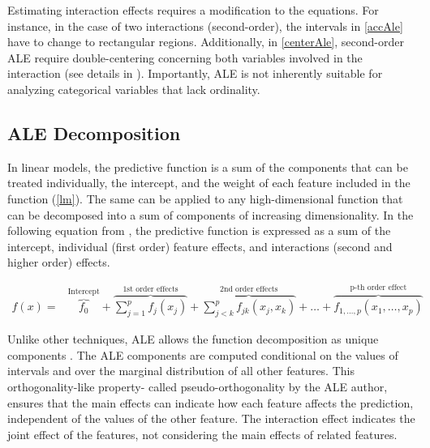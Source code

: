 Estimating interaction effects requires a modification to the equations. For instance, in the case of two interactions (second-order), the intervals in \ref{accAle} have to change to rectangular regions. Additionally, in \ref{centerAle}, second-order \gls{ALE} require double-centering concerning both variables involved in the interaction (see details in \cite{Apley2020VisualizingModels}). Importantly, \gls{ALE} is not inherently suitable for analyzing categorical variables that lack ordinality.

\subsection{ALE Decomposition}

In linear models, the predictive function is a sum of the components that can be treated individually, the intercept, and the weight of each feature included in the function (\ref{lm}). The same can be applied to any high-dimensional function that can be decomposed into a sum of components of increasing dimensionality. In the following equation from \cite{Molnar2019QuantifyingInterpretability}, the predictive function is expressed as a sum of the intercept, individual (first order) feature effects, and interactions (second and higher order) effects.

\begin{eqnarray}\label{eqn:decomp} f(x)  = &\overbrace{f_0}^\text{Intercept} + \overbrace{\sum_{j=1}^p f_j(x_j)}^\text{1st order effects} + \overbrace{\sum_{j<k}^p f_{jk}(x_j, x_k)}^\text{2nd order effects} + \ldots + \overbrace{f_{1,\ldots,p}(x_1, \ldots, x_p)}^\text{p-th order effect}
\end{eqnarray}

Unlike other techniques, \gls{ALE} allows the function decomposition as unique components \cite{Apley2020VisualizingModels}. The \gls{ALE} components are computed conditional on the values of intervals and over the marginal distribution of all other features. This orthogonality-like property- called pseudo-orthogonality by the \gls{ALE} author, ensures that the main effects can indicate how each feature affects the prediction, independent of the values of the other feature. The interaction effect indicates the joint effect of the features, not considering the main effects of related features. 
